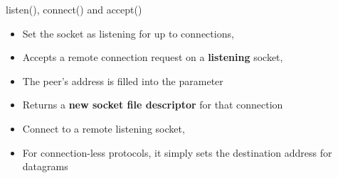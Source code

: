 \begin{frame}{listen(), connect() and accept()}

	\begin{itemize}
		\item Set the socket as listening for up to  connections, 
	\end{itemize}
	\vspace{0.5cm}
	\begin{itemize}
		\item Accepts a remote connection request on a \textbf{listening} socket, 
		\item The peer's address is filled into the  parameter
		\item Returns a \textbf{new socket file descriptor} for that connection
	\end{itemize}
	\vspace{0.5cm}
	\begin{itemize}
		\item Connect to a remote listening socket, 
		\item For connection-less protocols, it simply sets the destination address for datagrams
	\end{itemize}
\end{frame}

